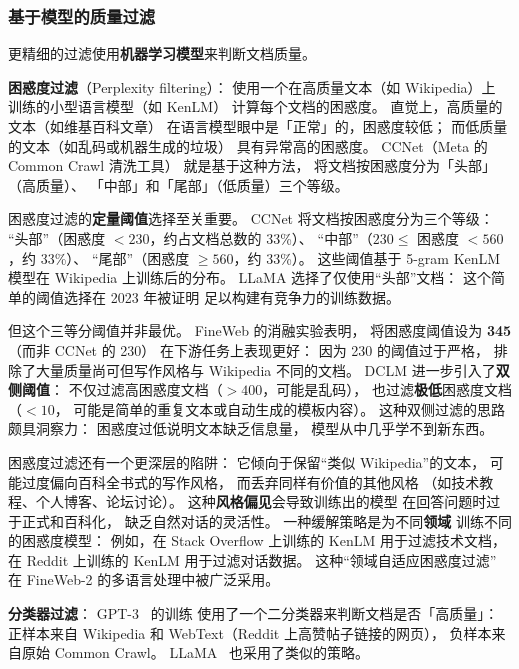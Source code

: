 \subsubsection{基于模型的质量过滤}

更精细的过滤使用\textbf{机器学习模型}来判断文档质量。

\textbf{困惑度过滤}（Perplexity filtering）：
使用一个在高质量文本（如 Wikipedia）上
训练的小型语言模型（如 KenLM）
计算每个文档的困惑度。
直觉上，高质量的文本（如维基百科文章）
在语言模型眼中是「正常」的，困惑度较低；
而低质量的文本（如乱码或机器生成的垃圾）
具有异常高的困惑度。
CCNet（Meta 的 Common Crawl 清洗工具）
就是基于这种方法，
将文档按困惑度分为「头部」（高质量）、
「中部」和「尾部」（低质量）三个等级。

困惑度过滤的\textbf{定量阈值}选择至关重要。
CCNet 将文档按困惑度分为三个等级：
“头部”（困惑度 $< 230$，约占文档总数的 33\%）、
“中部”（$230 \leq$ 困惑度 $< 560$，约 33\%）、
“尾部”（困惑度 $\geq 560$，约 33\%）。
这些阈值基于 5-gram KenLM 模型在 Wikipedia 上训练后的分布。
LLaMA 选择了仅使用“头部”文档：
这个简单的阈值选择在 2023 年被证明
足以构建有竞争力的训练数据。

但这个三等分阈值并非最优。
FineWeb 的消融实验表明，
将困惑度阈值设为 \textbf{345}（而非 CCNet 的 230）
在下游任务上表现更好：
因为 230 的阈值过于严格，
排除了大量质量尚可但写作风格与 Wikipedia 不同的文档。
DCLM 进一步引入了\textbf{双侧阈值}：
不仅过滤高困惑度文档（$> 400$，可能是乱码），
也过滤\textbf{极低}困惑度文档（$< 10$，
可能是简单的重复文本或自动生成的模板内容）。
这种双侧过滤的思路颇具洞察力：
困惑度过低说明文本缺乏信息量，
模型从中几乎学不到新东西。

困惑度过滤还有一个更深层的陷阱：
它倾向于保留“类似 Wikipedia”的文本，
可能过度偏向百科全书式的写作风格，
而丢弃同样有价值的其他风格
（如技术教程、个人博客、论坛讨论）。
这种\textbf{风格偏见}会导致训练出的模型
在回答问题时过于正式和百科化，
缺乏自然对话的灵活性。
一种缓解策略是为不同\textbf{领域}
训练不同的困惑度模型：
例如，在 Stack Overflow 上训练的 KenLM
用于过滤技术文档，
在 Reddit 上训练的 KenLM
用于过滤对话数据。
这种“领域自适应困惑度过滤”
在 FineWeb-2 的多语言处理中被广泛采用。

\textbf{分类器过滤}：
GPT-3~\cite{brown2020gpt3} 的训练
使用了一个二分类器来判断文档是否「高质量」：
正样本来自 Wikipedia 和 WebText（Reddit 上高赞帖子链接的网页），
负样本来自原始 Common Crawl。
LLaMA~\cite{touvron2023llama} 也采用了类似的策略。

